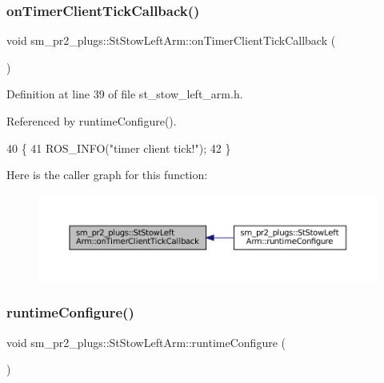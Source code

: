 \subsubsection{\texorpdfstring{on\+Timer\+Client\+Tick\+Callback()}{onTimerClientTickCallback()}}
{\footnotesize\ttfamily void sm\+\_\+pr2\+\_\+plugs\+::\+St\+Stow\+Left\+Arm\+::on\+Timer\+Client\+Tick\+Callback (\begin{DoxyParamCaption}{ }\end{DoxyParamCaption})\hspace{0.3cm}{\ttfamily [inline]}}



Definition at line 39 of file st\+\_\+stow\+\_\+left\+\_\+arm.\+h.



Referenced by runtime\+Configure().


\begin{DoxyCode}
40     \{
41         ROS\_INFO(\textcolor{stringliteral}{"timer client tick!"});
42     \}
\end{DoxyCode}
Here is the caller graph for this function\+:
\nopagebreak
\begin{figure}[H]
\begin{center}
\leavevmode
\includegraphics[width=350pt]{structsm__pr2__plugs_1_1StStowLeftArm_a9a93ba44d99b53a4800aeae059ea5bc4_icgraph}
\end{center}
\end{figure}
\mbox{\label{structsm__pr2__plugs_1_1StStowLeftArm_af3124c3f8bc9a03f7af8c49dd0469856}} 
\subsubsection{\texorpdfstring{runtime\+Configure()}{runtimeConfigure()}}
{\footnotesize\ttfamily void sm\+\_\+pr2\+\_\+plugs\+::\+St\+Stow\+Left\+Arm\+::runtime\+Configure (\begin{DoxyParamCaption}{ }\end{DoxyParamCaption})\hspace{0.3cm}{\ttfamily [inline]}}




